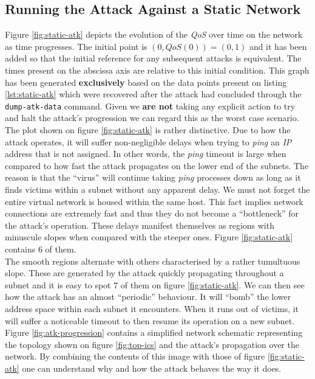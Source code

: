         \subsection{Running the Attack Against a Static Network}
            Figure \ref{fig:static-atk} depicts the evolution of the \textit{QoS} over time on the network as time progresses. The initial point is $(0, QoS(0)) = (0, 1)$ and it has been added so that the initial reference for any subsequent attacks is equivalent. The times present on the abscissa axis are relative to this initial condition. This graph has been generated \textbf{exclusively} based on the data points present on listing \ref{lst:static-atk} which were recovered after the attack had concluded through the \texttt{dump-atk-data} command. Given we \textbf{are not} taking any explicit action to try and halt the attack's progression we can regard this as the worst case scenario.\\

            The plot shown on figure \ref{fig:static-atk} is rather distinctive. Due to how the attack operates, it will suffer non-negligible delays when trying to \textit{ping} an \textit{IP} address that is not assigned. In other words, the \textit{ping} timeout is large when compared to how fast the attack propagates on the lower end of the subnets. The reason is that the ``virus'' will continue taking \textit{ping} processes down as long as it finds victims within a subnet without any apparent delay. We must not forget the entire virtual network is housed within the same host. This fact implies network connections are extremely fast and thus they do not become a ``bottleneck'' for the attack's operation. These delays manifest themselves as regions with minuscule slopes when compared with the steeper ones. Figure \ref{fig:static-atk} contains $6$ of them.\\

            The smooth regions alternate with others characterised by a rather tumultuous slope. These are generated by the attack quickly propagating throughout a subnet and it is easy to spot $7$ of them on figure \ref{fig:static-atk}. We can then see how the attack has an almost ``periodic'' behaviour. It will ``bomb'' the lower address space within each subnet it encounters. When it runs out of victims, it will suffer a noticeable timeout to then resume its operation on a new subnet.\\

            Figure \ref{fig:atk-progression} contains a simplified network schematic representing the topology shown on figure \ref{fig:top-ics} and the attack's propagation over the network. By combining the contents of this image with those of figure \ref{fig:static-atk} one can understand why and how the attack behaves the way it does.\\

